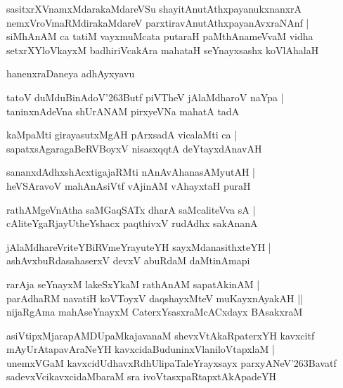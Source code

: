 \documentclass[twoside,12pt,openright]{book}
\def\S{\char'263}
\newcounter{shloka}[chapter]
\begin{document}
\begin{shloka}%
sasitxrXVnamxMdarakaMdareVSu shayitAnutAthxpayanukxnanxrA \\
nemxVroVmaRMdirakaMdareV parxtiravAnutAthxpayanAvxraNAnf |\\
siMhAnAM ca tatiM vayxmuMcata putaraH  paMthAnameVvaM vidha \\
setxrXYloVkayxM badhiriVcakAra mahataH seYnayxsashx koVlAhalaH 
\end{shloka}

\begin{center}
hanenxraDaneya adhAyxyavu
\end{center}

\begin{shloka}%
tatoV duMduBinAdoV\S Butf piVTheV jAlaMdharoV naYpa |\\
taninxnAdeVna shUrANAM pirxyeVNa mahatA tadA 
\end{shloka}

\begin{shloka}%
kaMpaMti girayasutxMgAH pArxsadA vicalaMti ca |\\
sapatxsAgaragaBeRVBoyxV nisasxqqtA deYtayxdAnavAH 
\end{shloka}

\begin{shloka}%
sananxdAdhxshAcxtigajaRMti nAnAvAhanasAMyutAH |\\
heVSAravoV mahAnAsiVtf vAjinAM vAhayxtaH puraH 
\end{shloka}

\begin{shloka}%
rathAMgeVnAtha saMGaqSATx dharA saMcaliteVva sA |\\
cAliteYgaRjayUtheYshacx paqthivxV rudAdhx sakAnanA 
\end{shloka}

\begin{shloka}%
jAlaMdhareVriteYBiRVmeYrayuteYH sayxMdanasithxteYH |\\
ashAvxbuRdasahaserxV devxV abuRdaM daMtinAmapi
\end{shloka}

\begin{shloka}%
rarAja seYnayxM lakeSxYkaM rathAnAM sapatAkinAM |\\
parAdhaRM navatiH koVToyxV daqshayxMteV muKayxnAyakAH ||\\
nijaRgAma mahAseYnayxM CaterxYsasxraMcACxdayx BAsakxraM 
\end{shloka}

\begin{shloka}%
asiVtipxMjarapAMDUpaMkajavanaM shevxVtAkaRpaterxYH kavxcitf \\
mAyUrAtapavAraNeYH kavxcidaBuduninxVlaniloVtapxlaM |\\
unemxVGaM kavxcidUdhavxRdhUlipaTaleYrayxsayx parxyANeV\S Bavatf \\
sadevxVcikavxcidaMbaraM sra ivoVtasxpaRtapxtAkApadeYH 
\end{shloka}
\end{document}
